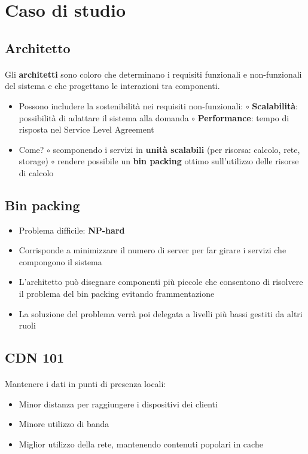 \documentclass[a4paper, 12pt]{report}
\begin{document}
          \section{Caso di studio}
          \subsection{Architetto}
          \paragraph{}Gli \textbf{architetti} sono coloro che determinano i requisiti funzionali e non-funzionali del sistema e che progettano le interazioni tra componenti.
          \begin{itemize}
            \item Possono includere la sostenibilità nei requisiti non-funzionali:
            \subitem $\circ$ \textbf{Scalabilità}: possibilità di adattare il sistema alla domanda
            \subitem $\circ$ \textbf{Performance}: tempo di risposta nel Service Level Agreement
            \item Come?
            \subitem $\circ$ scomponendo i servizi in \textbf{unità scalabili} (per risorsa: calcolo, rete, storage)
            \subitem $\circ$ rendere possibile un \textbf{bin packing} ottimo sull’utilizzo delle risorse di calcolo
          \end{itemize}
          \subsection{Bin packing}
          \begin{itemize}
            \item Problema difficile: \textbf{NP-hard}
            \item Corrisponde a minimizzare il numero di server per far girare i servizi che compongono il sistema
            \item L’architetto può disegnare componenti più piccole che consentono di risolvere il problema del bin packing evitando frammentazione
            \item La soluzione del problema verrà poi delegata a livelli più bassi gestiti da altri ruoli 
          \end{itemize}
          \subsection{CDN 101}
          \paragraph{}Mantenere i dati in punti di presenza locali:
          \begin{itemize}
            \item Minor distanza per raggiungere i dispositivi dei clienti
            \item Minore utilizzo di banda
            \item Miglior utilizzo della rete, mantenendo contenuti popolari in cache
          \end{itemize}
\end{document}
